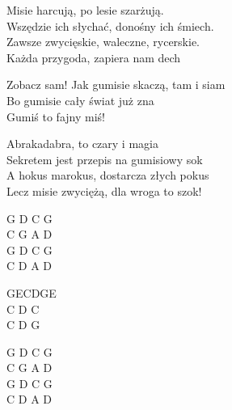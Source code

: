 \begin{text}
    Misie harcują, po lesie szarżują.\\
    Wszędzie ich słychać, donośny ich śmiech.\\
    Zawsze zwycięskie, waleczne, rycerskie.\\
    Każda przygoda, zapiera nam dech

    \vin Zobacz sam! Jak gumisie skaczą, tam i siam\\
    \vin Bo gumisie cały świat już zna\\
    \vin Gumiś to fajny miś!

    Abrakadabra, to czary i magia\\
    Sekretem jest przepis na gumisiowy sok\\
    A hokus marokus, dostarcza złych pokus\\
    Lecz misie zwyciężą, dla wroga to szok!
\end{text}
\begin{chord}
    G D C G\\
    C G A D\\
    G D C G\\
    C D A D

    GECDGE\\
    C D C\\
    C D G

    G D C G\\
    C G A D\\
    G D C G\\
    C D A D
\end{chord}
